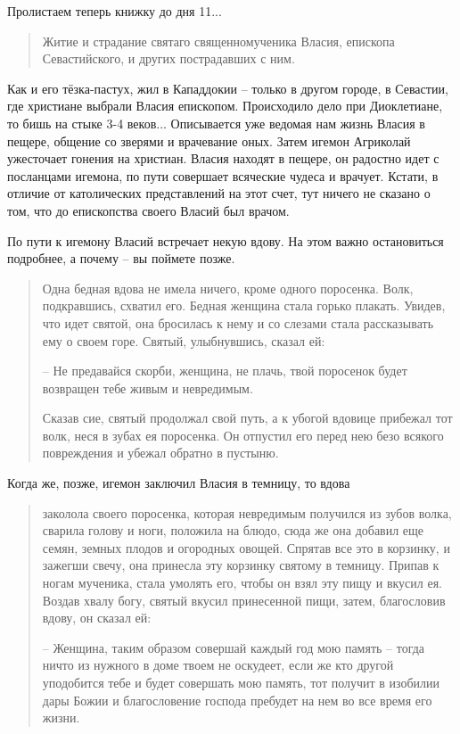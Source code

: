Пролистаем теперь книжку до дня 11...

\begin{quotation}
Житие и страдание святаго священномученика Власия, епископа Севастийского, и других пострадавших с ним.
\end{quotation}

   Как и его тёзка-пастух, жил в Кападдокии – только в другом городе, в Севастии, где христиане выбрали Власия епископом. Происходило дело при Диоклетиане, то бишь на стыке 3-4 веков... Описывается уже ведомая нам жизнь Власия в пещере, общение со зверями и врачевание оных. Затем игемон Агриколай ужесточает гонения на христиан. Власия находят в пещере, он радостно идет с посланцами игемона, по пути совершает всяческие чудеса и врачует. Кстати, в отличие от католических представлений на этот счет, тут ничего не сказано о том, что до епископства своего Власий был врачом. 

   По пути к игемону Власий встречает некую вдову. На этом важно остановиться подробнее, а почему – вы поймете позже.

\begin{quotation}
Одна бедная вдова не имела ничего, кроме одного поросенка. Волк, подкравшись, схватил его. Бедная женщина стала горько плакать. Увидев, что идет святой, она бросилась к нему и со слезами стала рассказывать ему о своем горе. Святый, улыбнувшись, сказал ей:

 – Не предавайся скорби, женщина, не плачь, твой поросенок будет возвращен тебе живым и невредимым.

   Сказав сие, святый продолжал свой путь, а к убогой вдовице прибежал тот волк, неся в зубах ея поросенка. Он отпустил его перед нею безо всякого повреждения и убежал обратно в пустыню.
\end{quotation}

Когда же, позже, игемон заключил Власия в темницу, то вдова

\begin{quotation}
заколола своего поросенка, которая невредимым получился из зубов волка, сварила голову и ноги, положила на блюдо, сюда же она добавил еще семян, земных плодов и огородных овощей. Спрятав все это в корзинку, и зажегши свечу, она принесла эту корзинку святому в темницу. Припав к ногам мученика, стала умолять его, чтобы он взял эту пищу и вкусил ея. Воздав хвалу богу, святый вкусил принесенной пищи, затем, благословив вдову, он сказал ей:

 – Женщина, таким образом совершай каждый год мою память – тогда ничто из нужного в доме твоем не оскудеет, если же кто другой уподобится тебе и будет совершать мою память, тот получит в изобилии дары Божии и благословение господа пребудет на нем во все время его жизни.
\end{quotation}

